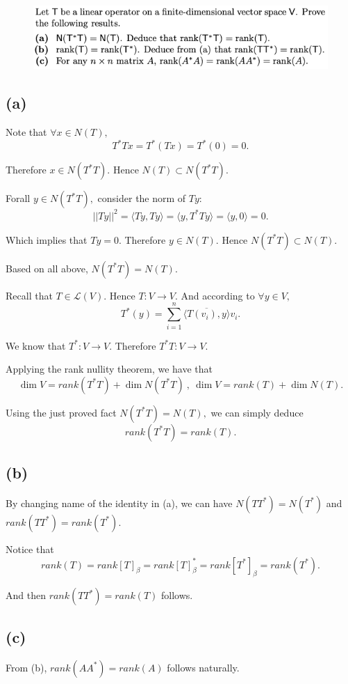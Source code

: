 \documentclass[12pt]{article}%
\begin{document}
\begin{figure}[htp]
    \centering %
    \includegraphics[width = 16cm]{img/Q2.png}
\end{figure}

\subsection{(a)}
Note that $\forall x \in N(T),$ $$T^*Tx = T^*(Tx)=T^*(0)=0.$$

Therefore $x\in N(T^*T).$ Hence $N(T) \subset N(T^*T).$

Forall $y \in N(T^*T), $ consider the norm of $Ty:$ 
$$||Ty||^2=\langle Ty,Ty \rangle=\langle y, T^*Ty \rangle = \langle y,0 \rangle=0.$$

Which implies that $Ty=0.$ Therefore $y \in N(T).$ Hence $N(T^*T) \subset N(T).$

Based on all above, $N(T^*T)=N(T).$

Recall that $T \in \mathcal{L}(V).$ Hence $T:V \to V.$ And according to $\forall y \in V,$
$$T^*(y)=\sum_{i=1}^n \overline{\langle T(v_i),y \rangle} v_i.$$

We know that $T^*:V \to V.$ Therefore $T^*T:V \to V.$

Applying the rank nullity theorem, we have that 
$$\dim{V} = rank(T^*T)+\dim{N(T^*T)}~,~\dim{V} = rank(T)+\dim{N(T)}.$$

Using the just proved fact $N(T^*T)=N(T),$ we can simply deduce $$rank(T^*T)=rank(T).$$

\subsection{(b)}
By changing name of the identity in (a), we can have $N(TT^*)=N(T^*)$ and $rank(TT^*)=rank(T^*).$

Notice that $$rank(T)=rank[T]_\beta=rank[T]_\beta^*=rank[T^*]_\beta=rank(T^*).$$

And then $rank(TT^*)=rank(T)$ follows.

\subsection{(c)}
From (b), $rank(AA^*)=rank(A)$ follows naturally. 
\end{document}

